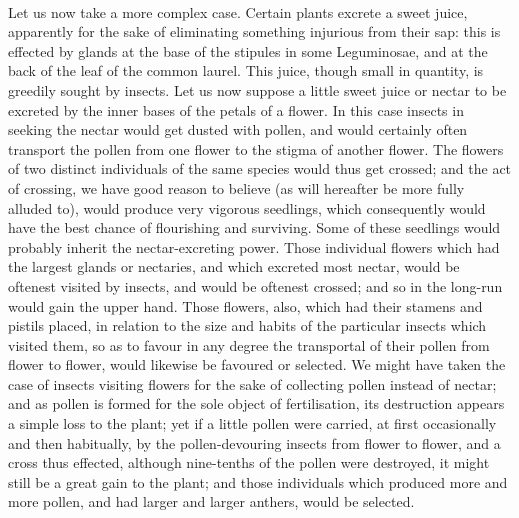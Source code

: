 \documentclass{article}
\begin{document}
\\
Let us now take a more complex case. Certain plants excrete a sweet juice, apparently for the sake of eliminating something injurious from their sap: this is effected by glands at the base of the stipules in some Leguminosae, and at the back of the leaf of the common laurel. This juice, though small in quantity, is greedily sought by insects. Let us now suppose a little sweet juice or nectar to be excreted by the inner bases of the petals of a flower. In this case insects in seeking the nectar would get dusted with pollen, and would certainly often transport the pollen from one flower to the stigma of another flower. The flowers of two distinct individuals of the same species would thus get crossed; and the act of crossing, we have good reason to believe (as will hereafter be more fully alluded to), would produce very vigorous seedlings, which consequently would have the best chance of flourishing and surviving. Some of these seedlings would probably inherit the nectar-excreting power. Those individual flowers which had the largest glands or nectaries, and which excreted most nectar, would be oftenest visited by insects, and would be oftenest crossed; and so in the long-run would gain the upper hand. Those flowers, also, which had their stamens and pistils placed, in relation to the size and habits of the particular insects which visited them, so as to favour in any degree the transportal of their pollen from flower to flower, would likewise be favoured or selected. We might have taken the case of insects visiting flowers for the sake of collecting pollen instead of nectar; and as pollen is formed for the sole object of fertilisation, its destruction appears a simple loss to the plant; yet if a little pollen were carried, at first occasionally and then habitually, by the pollen-devouring insects from flower to flower, and a cross thus effected, although nine-tenths of the pollen were destroyed, it might still be a great gain to the plant; and those individuals which produced more and more pollen, and had larger and larger anthers, would be selected.\\
\end{document}
